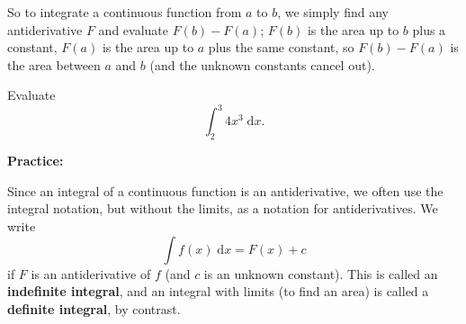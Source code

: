 \documentclass{article}
\newcommand{\diff}{\;\mathrm{d}}
\begin{document}
So to integrate a continuous function from $a$ to $b$, we simply find any antiderivative $F$ and evaluate $F(b)-F(a)$; $F(b)$ is the area up to $b$ plus a constant, $F(a)$ is the area up to $a$ plus the same constant, so $F(b)-F(a)$ is the area between $a$ and $b$ (and the unknown constants cancel out).\medskip



Evaluate
\[\int_2^3 4x^3\diff x.\]




\clearpage





\textbf{Practice:}\bigskip




Since an integral of a continuous function is an antiderivative, we often use the integral notation, but without the limits, as a notation for antiderivatives. We write
\[\int f(x)\diff x = F(x)+c\]
if $F$ is an antiderivative of $f$ (and $c$ is an unknown constant). This is called an \textbf{indefinite integral}, and an integral with limits (to find an area) is called a \textbf{definite integral}, by contrast.\bigskip
\end{document}
